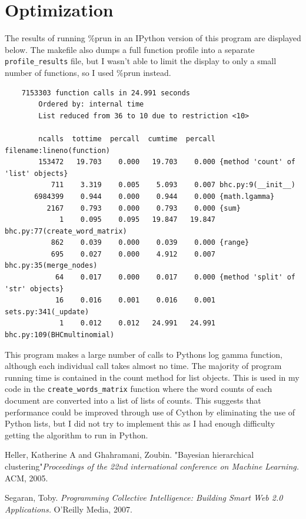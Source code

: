 \documentclass{article}
\begin{document}
\section{Optimization}
The results of running \%prun in an IPython version of this program are displayed below.  The makefile also dumps a full function
profile into a separate \texttt{profile\_results} file, but I wasn't able to limit the display to only a small number of functions, 
so I used \%prun instead.
\begin{verbatim}
    7153303 function calls in 24.991 seconds
        Ordered by: internal time
        List reduced from 36 to 10 due to restriction <10>

        ncalls  tottime  percall  cumtime  percall filename:lineno(function)
        153472   19.703    0.000   19.703    0.000 {method 'count' of 'list' objects}
           711    3.319    0.005    5.093    0.007 bhc.py:9(__init__)
       6984399    0.944    0.000    0.944    0.000 {math.lgamma}
          2167    0.793    0.000    0.793    0.000 {sum}
             1    0.095    0.095   19.847   19.847 bhc.py:77(create_word_matrix)
           862    0.039    0.000    0.039    0.000 {range}
           695    0.027    0.000    4.912    0.007 bhc.py:35(merge_nodes)
            64    0.017    0.000    0.017    0.000 {method 'split' of 'str' objects}
            16    0.016    0.001    0.016    0.001 sets.py:341(_update)
             1    0.012    0.012   24.991   24.991 bhc.py:109(BHCmultinomial)
\end{verbatim}
This program makes a large number of calls to Pythons log gamma function, although each individual call takes almost no time.  The majority of program running time is contained in the count method for list objects.  This is used in my code in the \texttt{create\_words\_matrix} function where the word counts of each document are converted into a list of lists of counts.  This suggests that performance could be improved through use of Cython by eliminating the use of Python lists, but I did not try to implement this as I had enough difficulty getting the algorithm to run in Python.

\begin{thebibliography}{1}

     Heller, Katherine A and Ghahramani, Zoubin. "Bayesian hierarchical clustering"{\em Proceedings of the 22nd international conference on Machine Learning.} ACM, 2005.
  
     Segaran, Toby.  {\em Programming Collective Intelligence: Building Smart Web 2.0 Applications.} O'Reilly Media, 2007.
\end{thebibliography}
\end{document}
